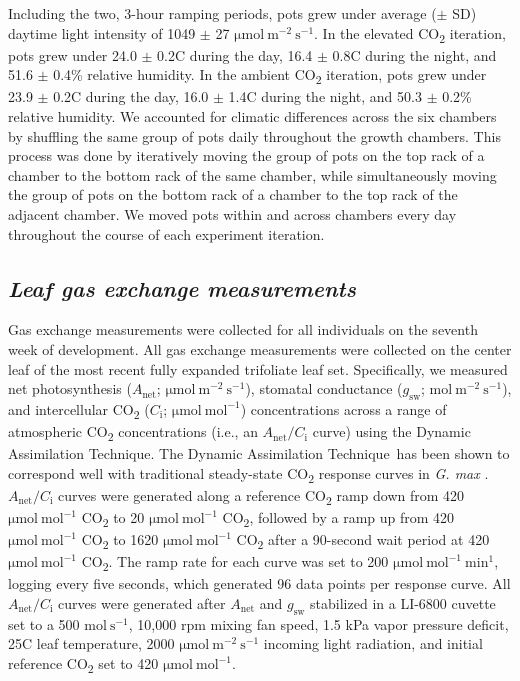     Including the two, 3-hour ramping periods, pots grew under average ($\pm$ SD) daytime light intensity of 1049 $\pm$ 27 $\mathrm{\mu mol\ m^{-2}\ s^{-1}}$. In the elevated CO\textsubscript{2} iteration, pots grew under 24.0 $\pm$ 0.2\textdegree{}C during the day, 16.4 $\pm$ 0.8\textdegree{}C during the night, and 51.6 $\pm$ 0.4\% relative humidity. In the ambient CO\textsubscript{2} iteration, pots grew under 23.9 $\pm$ 0.2\textdegree{}C during the day, 16.0 $\pm$ 1.4\textdegree{}C during the night, and 50.3 $\pm$ 0.2\% relative humidity. We accounted for climatic differences across the six chambers by shuffling the same group of pots daily throughout the growth chambers. This process was done by iteratively moving the group of pots on the top rack of a chamber to the bottom rack of the same chamber, while simultaneously moving the group of pots on the bottom rack of a chamber to the top rack of the adjacent chamber. We moved pots within and across chambers every day throughout the course of each experiment iteration.

    \subsection{\textit{Leaf gas exchange measurements}}

    Gas exchange measurements were collected for all individuals on the seventh week of development. All gas exchange measurements were collected on the center leaf of the most recent fully expanded trifoliate leaf set. Specifically, we measured net photosynthesis ($A_\mathrm{{net}}$; $\mathrm{\mu mol\ m^{-2}\ s^{-1}}$), stomatal conductance ($g_\mathrm{{sw}}$; $\mathrm{mol\ m^{-2}\ s^{-1}}$), and intercellular CO\textsubscript{2} ($C_\mathrm{{i}}$; $\mathrm{\mu mol\ mol^{-1}}$) concentrations across a range of atmospheric CO\textsubscript{2} concentrations (i.e., an $A_\mathrm{{net}}/C_\mathrm{i}$ curve) using the Dynamic Assimilation Technique\texttrademark. The Dynamic Assimilation Technique\texttrademark\ has been shown to correspond well with traditional steady-state CO\textsubscript{2} response curves in \textit{G. max} . $A_\mathrm{{net}}/C_\mathrm{i}$ curves were generated along a reference CO\textsubscript{2} ramp down from 420 $\mathrm{\mu mol\ mol^{-1}}$ CO\textsubscript{2} to 20 $\mathrm{\mu mol\ mol^{-1}}$ CO\textsubscript{2}, followed by a ramp up from 420 $\mathrm{\mu mol\ mol^{-1}}$ CO\textsubscript{2} to 1620 $\mathrm{\mu mol\ mol^{-1}}$ CO\textsubscript{2} after a 90-second wait period at 420 $\mathrm{\mu mol\ mol^{-1}}$ CO\textsubscript{2}. The ramp rate for each curve was set to 200 $\mathrm{\mu mol\ mol^{-1}\ min^{1}}$, logging every five seconds, which generated 96 data points per response curve. All $A_\mathrm{{net}}/C_\mathrm{i}$ curves were generated after $A_\mathrm{{net}}$ and $g_\mathrm{{sw}}$ stabilized in a LI-6800 cuvette set to a 500 $\mathrm{mol\ s^{-1}}$, 10,000 rpm mixing fan speed, 1.5 kPa vapor pressure deficit, 25\textdegree{}C leaf temperature, 2000 $\mathrm{\mu mol\ m^{-2}\ s^{-1}}$ incoming light radiation, and initial reference CO\textsubscript{2} set to 420 $\mathrm{\mu mol\ mol^{-1}}$.

